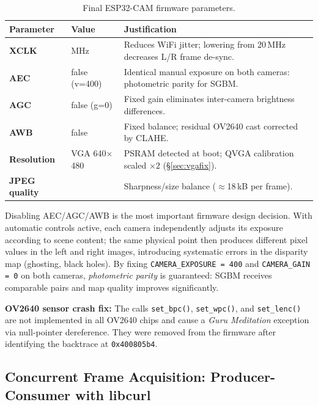 \documentclass[12pt, a4paper]{article}
\begin{document}
\begin{table}[htbp]
\centering\footnotesize
\caption{Final ESP32-CAM firmware parameters.}
\label{tab:firmware}
\begin{tabular}{>{\bfseries}p{2.5cm} >{\ttfamily}p{2.2cm} p{7.5cm}}
\toprule
\normalfont\textbf{Parameter} & \normalfont\textbf{Value} & \textbf{Justification} \\
\midrule
XCLK          & 6 MHz          & Reduces WiFi jitter; lowering from 20\,MHz decreases L/R frame de-sync. \\[2pt]
AEC           & false (v=400)  & Identical manual exposure on both cameras: photometric parity for SGBM. \\[2pt]
AGC           & false (g=0)    & Fixed gain eliminates inter-camera brightness differences. \\[2pt]
AWB           & false          & Fixed balance; residual OV2640 cast corrected by CLAHE. \\[2pt]
Resolution    & VGA 640$\times$480 & PSRAM detected at boot; QVGA calibration scaled $\times2$ (\S\ref{sec:vgafix}). \\[2pt]
JPEG quality  & 12             & Sharpness/size balance ($\approx$18\,kB per frame). \\
\bottomrule
\end{tabular}
\end{table}

Disabling AEC/AGC/AWB is the most important firmware design decision. With automatic
controls active, each camera independently adjusts its exposure according to scene
content; the same physical point then produces different pixel values in the left and
right images, introducing systematic errors in the disparity map (ghosting, black
holes). By fixing \texttt{CAMERA\_EXPOSURE = 400} and \texttt{CAMERA\_GAIN = 0} on
both cameras, \emph{photometric parity} is guaranteed: SGBM receives comparable pairs
and map quality improves significantly.

\textbf{OV2640 sensor crash fix:} The calls
\texttt{set\_bpc()}, \texttt{set\_wpc()}, and \texttt{set\_lenc()} are not implemented
in all OV2640 chips and cause a \emph{Guru Meditation} exception via null-pointer
dereference. They were removed from the firmware after identifying the backtrace at
\texttt{0x400805b4}.

\subsection{Concurrent Frame Acquisition: Producer-Consumer with libcurl}
\end{document}
